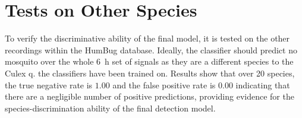 \section{Tests on Other Species}
\label{sec:exp-other}
    To verify the discriminative ability of the final model, it is tested on the other recordings within the HumBug database. Ideally, the classifier should predict no mosquito over the whole \SI{6}{\hour} set of signals as they are a different species to the Culex q. the classifiers have been trained on. Results show that over 20 species, the true negative rate is $1.00$ and the false positive rate is $0.00$ indicating that there are a negligible number of positive predictions, providing evidence for the species-discrimination ability of the final detection model.